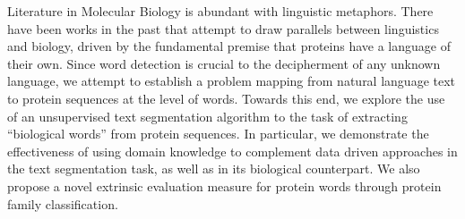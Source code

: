 Literature in Molecular Biology is abundant with linguistic metaphors. There have been works in the past that attempt to draw parallels between linguistics and biology, driven by the fundamental premise that proteins have a language of their own. Since word detection is crucial to the decipherment of any  unknown language, we attempt to establish a problem mapping from natural language text to protein sequences at the level of words. Towards this end, we explore the use of an unsupervised text segmentation algorithm to the task of extracting ``biological words'' from protein sequences. In particular, we demonstrate the effectiveness of using domain knowledge to complement data driven approaches in the text segmentation task, as well as in its biological counterpart. We also propose a novel extrinsic evaluation measure for protein words through protein family classification.

